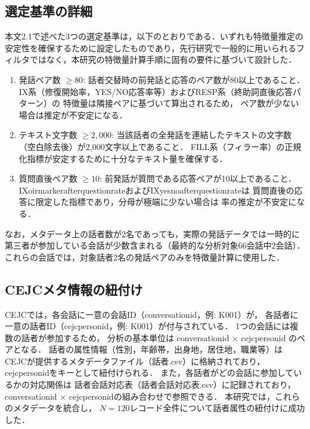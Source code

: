 \documentclass[dvipdfmx,11pt,a4paper]{bxjsarticle}
\renewcommand{\_}{\paperorigunderscore\allowbreak}%
\begin{document}
\subsection{選定基準の詳細}
本文2.1で述べた3つの選定基準は，以下のとおりである．いずれも特徴量推定の安定性を確保するために設定したものであり，先行研究で一般的に用いられるフィルタではなく，本研究の特徴量計算手順に固有の要件に基づいて設計した．
\begin{enumerate}
  \item 発話ペア数 $\geq 80$:
    話者交替時の前発話と応答のペア数が80以上であること．
    IX系（修復開始率，YES/NO応答率等）およびRESP系（終助詞直後応答パターン）の
    特徴量は隣接ペアに基づいて算出されるため，
    ペア数が少ない場合は推定が不安定になる．
  \item テキスト文字数 $\geq 2{,}000$:
    当該話者の全発話を連結したテキストの文字数（空白除去後）が2,000文字以上であること．
    FILL系（フィラー率）の正規化指標が安定するために十分なテキスト量を確保する．
  \item 質問直後ペア数 $\geq 10$:
    前発話が質問である応答ペアが10以上であること．
    IX\_oirmarker\_after\_question\_rateおよびIX\_yesno\_after\_question\_rateは
    質問直後の応答に限定した指標であり，分母が極端に少ない場合は
    率の推定が不安定になる．
\end{enumerate}
なお，メタデータ上の話者数が2名であっても，実際の発話データでは一時的に第三者が参加している会話が少数含まれる（最終的な分析対象66会話中2会話）．これらの会話では，対象話者2名の発話ペアのみを特徴量計算に使用した．

\subsection{CEJCメタ情報の紐付け}
CEJCでは，各会話に一意の会話ID（conversation\_id，例: K001\_011）が，
各話者に一意の話者ID（cejc\_person\_id，例: K001）が付与されている．
1つの会話には複数の話者が参加するため，
分析の基本単位は conversation\_id $\times$ cejc\_person\_id のペアとなる．
話者の属性情報（性別，年齢帯，出身地，居住地，職業等）は
CEJCが提供するメタデータファイル（話者.csv）に格納されており，
cejc\_person\_idをキーとして紐付けられる．
また，各話者がどの会話に参加しているかの対応関係は
話者会話対応表（話者会話対応表.csv）に記録されており，
conversation\_id $\times$ cejc\_person\_idの組み合わせで参照できる．
本研究では，これらのメタデータを統合し，
$N = 120$レコード全件について話者属性の紐付けに成功した．
\end{document}
